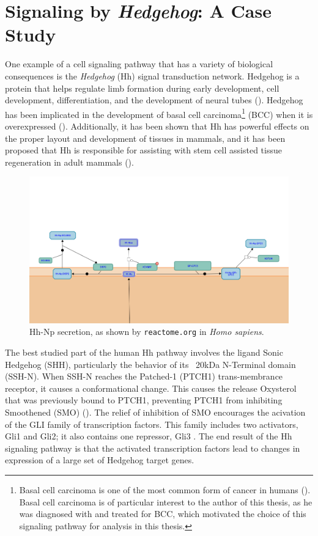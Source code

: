 \documentclass[12pt,twoside]{reedthesis}
\theoremstyle{definition}
\begin{document}
\section{Signaling by \emph{Hedgehog}: A Case Study}

One example of a cell signaling pathway that has a variety of biological consequences is the \textit{Hedgehog} (Hh) signal transduction network. Hedgehog is a protein that helps regulate limb formation during early development, cell development, differentiation, and the development of neural tubes (\cite{Hui2011}). Hedgehog has been implicated in the development of basal cell carcinoma\footnote{Basal cell carcinoma is one of the most common form of cancer in humans (\cite{Rubin2009}). Basal cell carcinoma is of particular interest to the author of this thesis, as he was diagnosed with and treated for BCC, which motivated the choice of this signaling pathway for analysis in this thesis.} (BCC) when it is overexpressed (\cite{Dahmane1997}). Additionally, it has been shown that Hh has powerful effects on the proper layout and development of tissues in mammals, and it has been proposed that Hh is responsible for assisting with stem cell assisted tissue regeneration in adult mammals (\cite{Ahn2005}).

\begin{figure}[h]
  \begin{center}
    \includegraphics[width=\textwidth]{Hh-Np_secretion}
  \caption[Hedgehog secretion in \textit{Homo sapiens}]{Hh-Np secretion, as shown by \texttt{reactome.org} in \textit{Homo sapiens}.}
  \label{fig:Hh-Np_secretion}
  \end{center}
\end{figure}

The best studied part of the human Hh pathway involves the ligand Sonic Hedgehog (SHH), particularly the behavior of its ~20kDa N-Terminal domain (SSH-N). When SSH-N reaches the Patched-1 (PTCH1) trans-membrance receptor, it causes a conformational change. This causes the release Oxysterol that was previously bound to PTCH1, preventing PTCH1 from inhibiting Smoothened (SMO) (\cite{Carpenter1998}). The relief of inhibition of SMO encourages the acivation of the GLI family of transcription factors. This family includes two activators, Gli1 and Gli2; it also contains one repressor, Gli3 \cite{Rahnama2006}. The end result of the Hh signaling pathway is that the activated transcription factors lead to changes in expression of a large set of Hedgehog target genes.
\end{document}
